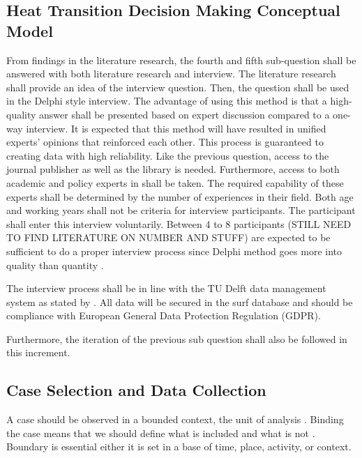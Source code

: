 
\subsection{Heat Transition Decision Making Conceptual Model}

From findings in the literature research, the fourth and fifth sub-question shall be answered with both literature research and interview. The literature research shall provide an idea of the interview question. Then, the question shall be used in the Delphi style interview. 
The advantage of using this method is that a high-quality answer shall be presented based on expert discussion compared to a one-way interview. It is expected that this method will have resulted in unified experts’ opinions that reinforced each other. This process is guaranteed to creating data with high reliability.
Like the previous question, access to the journal publisher as well as the library is needed. Furthermore, access to both academic and policy experts in shall be taken.  The required capability of these experts shall be determined by the number of experiences in their field. Both age and working years shall not be criteria for interview participants. The participant shall enter this interview voluntarily. Between 4 to 8 participants (STILL NEED TO FIND LITERATURE ON NUMBER AND STUFF) are expected to be sufficient to do a proper interview process since Delphi method goes more into quality than quantity \citep{Boulkedid2011UsingReview}.

The interview process shall be in line with the TU Delft data management system as stated by \citep{GrootKormelink-TBM2018ProcessingPrivacy}. All data will be secured in the surf database and should be compliance with European General Data Protection Regulation (GDPR). 

Furthermore, the iteration of the previous sub question shall also be followed in this increment.  

\subsection{Case Selection and Data Collection}

A case should be observed in a bounded context, the unit of analysis \citep{Miles1994MilesAnalysis}. Binding the case means that we should define what is included and what is not \citep{Baxter2008QualitativeResearchers}. Boundary is essential \citep{Yin2004TheAnthology} either it is set in a base of time, place, activity, or context.

